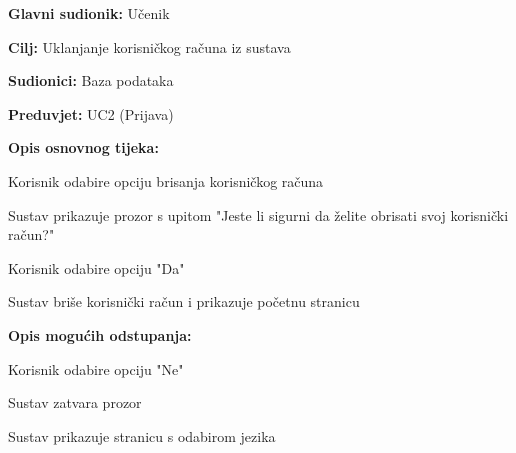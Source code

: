 					\noindent {}
					\begin{packed_item}
						
						\item \textbf{Glavni sudionik: }Učenik
						\item  \textbf{Cilj:} Uklanjanje korisničkog računa iz sustava
						\item  \textbf{Sudionici:} Baza podataka
						\item  \textbf{Preduvjet:} UC2 (Prijava)
						\item  \textbf{Opis osnovnog tijeka:}
						
						\item[] \begin{packed_enum}
							
							\item Korisnik odabire opciju brisanja korisničkog računa
							\item Sustav prikazuje prozor s upitom "Jeste li sigurni da želite obrisati svoj korisnički račun?"
							\item Korisnik odabire opciju "Da"
							\item Sustav briše korisnički račun i prikazuje početnu stranicu
						\end{packed_enum}
						
						\item  \textbf{Opis mogućih odstupanja:}
						
						\item[] \begin{packed_item}
							
							\item[3.a] Korisnik odabire opciju "Ne"
							\item[] \begin{packed_enum}
								
								\item Sustav zatvara prozor
								\item Sustav prikazuje stranicu s odabirom jezika
								
							\end{packed_enum}
							
						\end{packed_item}
					\end{packed_item}
					
